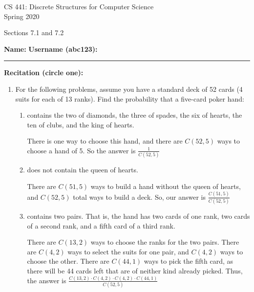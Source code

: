 \documentclass[12pt]{article}
\newenvironment{answer}{\larger[2]}{}
\begin{document}
\begin{center}
CS 441: Discrete Structures for Computer Science \\
{\smaller[1] Spring 2020} \\

\vspace {0.25in}

Sections 7.1 and 7.2
\end{center}

\vspace{0.25in}

{\smaller[1]
\textbf{Name:} \hrulefill
\hspace{1em}
\textbf{Username (abc123):} \rule{1.25in}{0.4pt}

\null \textbf{Recitation (circle one):}
\hfill
}

\begin{enumerate} %


\item For the following problems, assume you have a standard deck of 52 cards (4
suits for each of 13 ranks). Find the probability that a five-card poker hand:
%
\begin{enumerate}[itemsep=\fill,after=\vfill\vfill] %

\item contains the two of diamonds, the three of spades, the six of hearts, the
ten of clubs, and the king of hearts.

\begin{answer}
There is one way to choose this hand, and there are $C(52, 5)$ ways to choose a
hand of 5. So the answer is $\frac{1}{C(52, 5)}$
\end{answer}

\item does not contain the queen of hearts.

\begin{answer}
There are $C(51, 5)$ ways to build a hand without the queen of hearts, and
$C(52, 5)$ total ways to build a deck. So, our answer is $\frac{C(51, 5)}{C(52,
5)}$
\end{answer}

\item contains two pairs. That is, the hand has two cards of one rank, two cards of a second rank, and a fifth card of a third rank.

\begin{answer}
There are $C(13,2)$ ways to choose the ranks for the two pairs. There are
$C(4,2)$ ways to select the suits for one pair, and $C(4,2)$ ways to choose the
other. There are $C(44, 1)$ ways to pick the fifth card, as there will be 44
cards left that are of neither kind already picked. Thus, the answer is
$\displaystyle\frac{C(13,2) \cdot C(4,2) \cdot C(4,2) \cdot C(44, 1)}{C(52, 5)}$
\end{answer}


\end{enumerate}
\end{enumerate}
\end{document}
